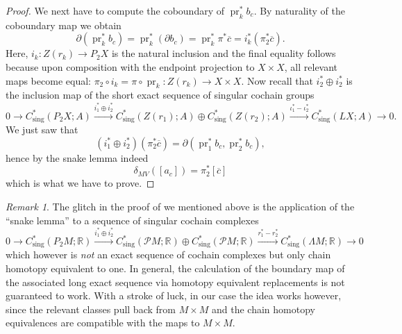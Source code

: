 \documentclass[a4paper,twoside]{article}
\theoremstyle{plain}
\theoremstyle{definition}
\theoremstyle{remark}
\newtheorem{remark}[theorem]{Remark}
\newcommand{\reals}{\mathbb{R}}
\newcommand{\boundary}[1]{\partial#1}
\DeclareMathOperator{\sing}{sing}
\DeclareMathOperator{\pr}{pr}
\begin{document}
\begin{proof}
We next have to compute the coboundary of $\pr_k^*b_c$. By naturality of the
coboundary map we obtain
  \begin{equation*}
    \boundary(\pr_k^*b_c) = \pr_k^*(\boundary b_c) = \pr_k^*\pi^*\overline c =
    i_k^*(\pi_2^* \overline c).
  \end{equation*}
Here, $i_k\colon Z(r_k)\to P_2X$ is the natural inclusion and the final
equality follows because upon composition with the endpoint projection to
$X\times X$, all relevant maps become equal: $\pi_2 \circ i_k = \pi\circ
\pr_k\colon Z(r_k)\to X\times X$. Now recall that $i_2^*\oplus i_2^*$ is the
inclusion map of the short exact sequence of singular cochain groups
{\small
  \begin{equation*}
  0 \to C^*_{\sing}(P_2X;A) \xrightarrow{i_1^*\oplus i_2^*}
  C^*_{\sing}(Z(r_1);A)\oplus C^*_{\sing}(Z(r_2);A) \xrightarrow{ \iota_1^*
    -\iota_2^*} C^*_{\sing}(LX;A) \to 0.
\end{equation*}
}
We just saw that
\begin{equation*}
  (i_1^*\oplus i_2^*) (\pi_2^* \overline c) =\boundary(\pr_1^*b_c,\pr_2^*b_c),
\end{equation*}
hence by the snake lemma indeed
\begin{equation*}
  \delta_{MV}([a_c]) =\pi_2^*[\overline c]
\end{equation*}
which is what we have to prove.
\end{proof}

\begin{remark}
  The glitch in the proof of \cite[Theorem 3.5]{GrantMescher} we mentioned
  above is the
  application of the ``snake lemma'' to a sequence of singular cochain
  complexes
  {\small
  \begin{equation*}
    0 \to C^*_{\sing}(P_2M;\reals)\xrightarrow{i_1^*\oplus i_2^*}
    C^*_{\sing}(\mathcal{P}M;\reals)\oplus C^*_{\sing}(\mathcal{P}M;\reals)
    \xrightarrow{r_1^*-r_2^*} C^*_{\sing}(\Lambda M;\reals)\to 0
  \end{equation*}
  }
  which however is \emph{not} an exact sequence of cochain complexes but only chain
  homotopy equivalent to one. In general, the calculation of the boundary map
  of the associated long exact sequence via homotopy equivalent replacements
  is not guaranteed to work. With a stroke of luck, in our case the idea
  works however, since the relevant classes pull back from $M\times M$ and
  the chain homotopy equivalences are compatible with the maps to $M\times M$.
\end{remark}
\end{document}

